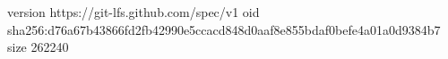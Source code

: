 version https://git-lfs.github.com/spec/v1
oid sha256:d76a67b43866fd2fb42990e5ccacd848d0aaf8e855bdaf0befe4a01a0d9384b7
size 262240

